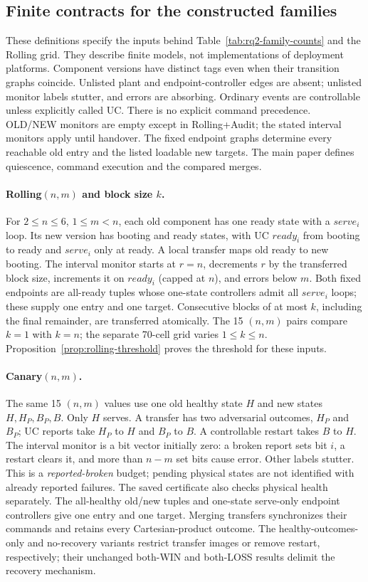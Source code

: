 \subsection{Finite contracts for the constructed families}\label{ta:constructed_contracts}
These definitions specify the inputs behind Table~\ref{tab:rq2-family-counts} and the Rolling grid. They describe finite models, not implementations of deployment platforms. Component versions have distinct tags even when their transition graphs coincide. Unlisted plant and endpoint-controller edges are absent; unlisted monitor labels stutter, and errors are absorbing. Ordinary events are controllable unless explicitly called UC. There is no explicit command precedence. OLD/NEW monitors are empty except in Rolling+Audit; the stated interval monitors apply until handover. The fixed endpoint graphs determine every reachable old entry and the listed loadable new targets. The main paper defines quiescence, command execution and the compared merges.

\paragraph{Rolling$(n,m)$ and block size $k$.}
For $2\leq n\leq6$, $1\leq m<n$, each old component has one ready state with a $serve_i$ loop. Its new version has booting and ready states, with UC $ready_i$ from booting to ready and $serve_i$ only at ready. A local transfer maps old ready to new booting. The interval monitor starts at $r=n$, decrements $r$ by the transferred block size, increments it on $ready_i$ (capped at $n$), and errors below $m$. Both fixed endpoints are all-ready tuples whose one-state controllers admit all $serve_i$ loops; these supply one entry and one target. Consecutive blocks of at most $k$, including the final remainder, are transferred atomically. The 15 $(n,m)$ pairs compare $k=1$ with $k=n$; the separate 70-cell grid varies $1\leq k\leq n$. Proposition~\ref{prop:rolling-threshold} proves the threshold for these inputs.

\paragraph{Canary$(n,m)$.}
The same 15 $(n,m)$ values use one old healthy state $H$ and new states $H,H_P,B_P,B$. Only $H$ serves. A transfer has two adversarial outcomes, $H_P$ and $B_P$; UC reports take $H_P$ to $H$ and $B_P$ to $B$. A controllable restart takes $B$ to $H$. The interval monitor is a bit vector initially zero: a broken report sets bit $i$, a restart clears it, and more than $n-m$ set bits cause error. Other labels stutter. This is a \emph{reported-broken} budget; pending physical states are not identified with already reported failures. The saved certificate also checks physical health separately. The all-healthy old/new tuples and one-state serve-only endpoint controllers give one entry and one target. Merging transfers synchronizes their commands and retains every Cartesian-product outcome. The healthy-outcomes-only and no-recovery variants restrict transfer images or remove restart, respectively; their unchanged both-WIN and both-LOSS results delimit the recovery mechanism.

